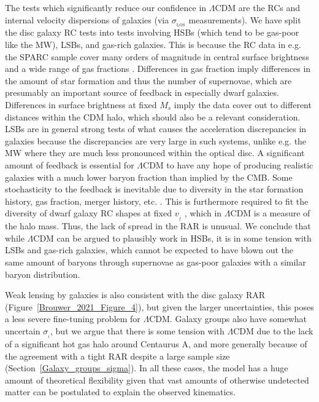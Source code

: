 \documentclass[fleqn,usenatbib,useAMS]{mnras} %
\begin{document}
The tests which significantly reduce our confidence in $\Lambda$CDM are the RCs and internal velocity dispersions of galaxies (via $\sigma_{_\text{LOS}}$ measurements). We have split the disc galaxy RC tests into tests involving HSBs (which tend to be gas-poor like the MW), LSBs, and gas-rich galaxies. This is because the RC data in e.g. the SPARC sample cover many orders of magnitude in central surface brightness and a wide range of gas fractions \citep{SPARC}. Differences in gas fraction imply differences in the amount of star formation and thus the number of supernovae, which are presumably an important source of feedback in especially dwarf galaxies. Differences in surface brightness at fixed $M_s$ imply the data cover out to different distances within the CDM halo, which should also be a relevant consideration. LSBs are in general strong tests of what causes the acceleration discrepancies in galaxies because the discrepancies are very large in such systems, unlike e.g. the MW where they are much less pronounced within the optical disc. A significant amount of feedback is essential for $\Lambda$CDM to have any hope of producing realistic galaxies with a much lower baryon fraction than implied by the CMB. Some stochasticity to the feedback is inevitable due to diversity in the star formation history, gas fraction, merger history, etc. \citep{Desmond_2017a, Desmond_2017b}. This is furthermore required to fit the diversity of dwarf galaxy RC shapes at fixed $v_{_f}$ \citep{Oman_2015}, which in $\Lambda$CDM is a measure of the halo mass. Thus, the lack of spread in the RAR is unusual. We conclude that while $\Lambda$CDM can be argued to plausibly work in HSBs, it is in some tension with LSBs and gas-rich galaxies, which cannot be expected to have blown out the same amount of baryons through supernovae as gas-poor galaxies with a similar baryon distribution.

Weak lensing by galaxies is also consistent with the disc galaxy RAR (Figure~\ref{Brouwer_2021_Figure_4}), but given the larger uncertainties, this poses a less severe fine-tuning problem for $\Lambda$CDM. Galaxy groups also have somewhat uncertain $\sigma_{_i}$, but we argue that there is some tension with $\Lambda$CDM due to the lack of a significant hot gas halo around Centaurus A, and more generally because of the agreement with a tight RAR despite a large sample size (Section~\ref{Galaxy_groups_sigma}). In all these cases, the model has a huge amount of theoretical flexibility given that vast amounts of otherwise undetected matter can be postulated to explain the observed kinematics.
\end{document}
